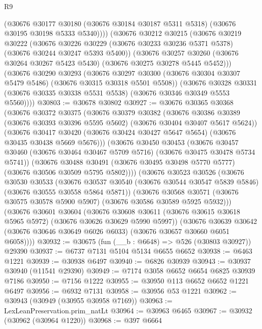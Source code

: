 \begin{lexlean}{R9}
\begin{coremodule}
        (@30676
          @30177
          @30180
          (@30676 @30184 @30187 @5311 @5318)
          (@30676 @30195 @30198 @5333 @5340))))
    (@30676
      @30212
      @30215
      (@30676
        @30219
        @30222
        (@30676 @30226 @30229 (@30676 @30233 @30236 @5371 @5378) (@30676 @30244 @30247 @5393 @5400))
        (@30676
          @30257
          @30260
          (@30676 @30264 @30267 @5423 @5430)
          (@30676 @30275 @30278 @5445 @5452)))
      (@30676
        @30290
        @30293
        (@30676 @30297 @30300 (@30676 @30304 @30307 @5479 @5486) (@30676 @30315 @30318 @5501 @5508))
        (@30676
          @30328
          @30331
          (@30676 @30335 @30338 @5531 @5538)
          (@30676 @30346 @30349 @5553 @5560))))
@30803 := @30678 @30802
@30927 := @30676
    @30365
    @30368
    (@30676
      @30372
      @30375
      (@30676
        @30379
        @30382
        (@30676 @30386 @30389 (@30676 @30393 @30396 @5595 @5602) (@30676 @30404 @30407 @5617 @5624))
        (@30676
          @30417
          @30420
          (@30676 @30424 @30427 @5647 @5654)
          (@30676 @30435 @30438 @5669 @5676)))
      (@30676
        @30450
        @30453
        (@30676 @30457 @30460 (@30676 @30464 @30467 @5709 @5716) (@30676 @30475 @30478 @5734 @5741))
        (@30676
          @30488
          @30491
          (@30676 @30495 @30498 @5770 @5777)
          (@30676 @30506 @30509 @5795 @5802))))
    (@30676
      @30523
      @30526
      (@30676
        @30530
        @30533
        (@30676 @30537 @30540 (@30676 @30544 @30547 @5839 @5846) (@30676 @30555 @30558 @5864 @5871))
        (@30676
          @30568
          @30571
          (@30676 @30575 @30578 @5900 @5907)
          (@30676 @30586 @30589 @5925 @5932)))
      (@30676
        @30601
        @30604
        (@30676 @30608 @30611 (@30676 @30615 @30618 @5965 @5972) (@30676 @30626 @30629 @5990 @5997))
        (@30676
          @30639
          @30642
          (@30676 @30646 @30649 @6026 @6033)
          (@30676 @30657 @30660 @6051 @6058))))
@30932 := @30675 (fun (__b : @6648) => @526 (@30803 @30927)) @29390
@30937 := @6737 @7131 @5104 @5134 @6655 @6652
@30938 := @6463 @1221
@30939 := @30938 @6497
@30940 := @6826 @30939
@30943 := @30937 @30940 (@11541 @29390)
@30949 := @7174 @3058 @6652 @6654 @6825 @30939 @7186
@30950 := @7156 @1222
@30955 := @30950 @113 @6652 @6652 @1221 @6497
@30956 := @6932 @7131
@30958 := @30956 @53 @1221
@30962 := @30943 (@30949 (@30955 @30958 @7169))
@30963 := LexLeanPreservation.prim_natLt
@30964 := @30963 @6465
@30967 := @30932 (@30962 (@30964 @1220))
@30968 := @397 @6664

\end{coremodule}
\end{lexlean}

